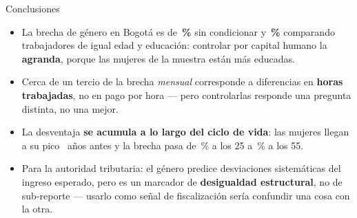 \documentclass[aspectratio=169]{beamer}
\begin{document}
\begin{frame}{Conclusiones}
  \begin{itemize}
    \item La brecha de género en Bogotá es de \textbf{\GapUncondPct\,\%} sin
      condicionar y \textbf{\GapHKPct\,\%} comparando trabajadores de igual edad
      y educación: controlar por capital humano la \textbf{agranda}, porque las
      mujeres de la muestra están más educadas.
    \item Cerca de un tercio de la brecha \emph{mensual} corresponde a
      diferencias en \textbf{horas trabajadas}, no en pago por hora --- pero
      controlarlas responde una pregunta distinta, no una mejor.
    \item La desventaja \textbf{se acumula a lo largo del ciclo de vida}: las
      mujeres llegan a su pico \PeakDiff\ años antes y la brecha pasa de
      \GapAtTwentyFive\,\% a los 25 a \GapAtFiftyFive\,\% a los 55.
    \item Para la autoridad tributaria: el género predice desviaciones
      sistemáticas del ingreso esperado, pero es un marcador de
      \textbf{desigualdad estructural}, no de sub-reporte --- usarlo como señal
      de fiscalización sería confundir una cosa con la otra.
  \end{itemize}
\end{frame}
\end{document}
